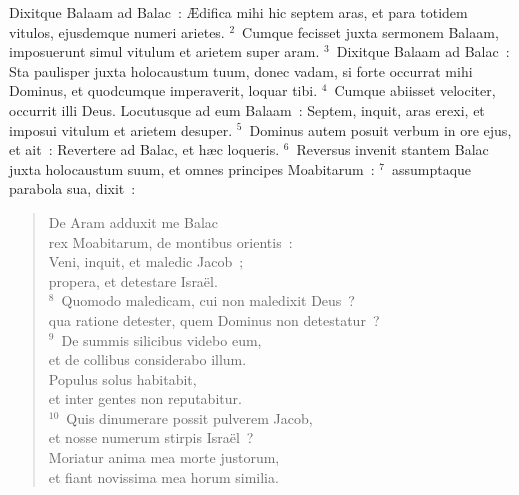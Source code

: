 \lettrine[lines=3,image=true,loversize=0.05,lraise=-0.03]{D}{}ixitque Balaam ad Balac~: \AE difica mihi hic septem aras, et para totidem vitulos, ejusdemque numeri arietes.
${}^{2}$~Cumque fecisset juxta sermonem Balaam, imposuerunt simul vitulum et arietem super aram.
${}^{3}$~Dixitque Balaam ad Balac~: Sta paulisper juxta holocaustum tuum, donec vadam, si forte occurrat mihi Dominus, et quodcumque imperaverit, loquar tibi.
${}^{4}$~Cumque abiisset velociter, occurrit illi Deus. Locutusque ad eum Balaam~: Septem, inquit, aras erexi, et imposui vitulum et arietem desuper.
${}^{5}$~Dominus autem posuit verbum in ore ejus, et ait~: Revertere ad Balac, et h\ae c loqueris.
${}^{6}$~Reversus invenit stantem Balac juxta holocaustum suum, et omnes principes Moabitarum~:
${}^{7}$~assumptaque parabola sua, dixit~: \begin{flushleft}\begin{verse}De Aram adduxit me Balac\\ rex Moabitarum, de montibus orientis~:\\ Veni, inquit, et maledic Jacob~;\\ propera, et detestare Isra\"el.\\
${}^{8}$~Quomodo maledicam, cui non maledixit Deus~?\\ qua ratione detester, quem Dominus non detestatur~?\\
${}^{9}$~De summis silicibus videbo eum,\\ et de collibus considerabo illum.\\ Populus solus habitabit,\\ et inter gentes non reputabitur.\\
${}^{10}$~Quis dinumerare possit pulverem Jacob,\\ et nosse numerum stirpis Isra\"el~?\\ Moriatur anima mea morte justorum,\\ et fiant novissima mea horum similia.\end{verse}\end{flushleft}


